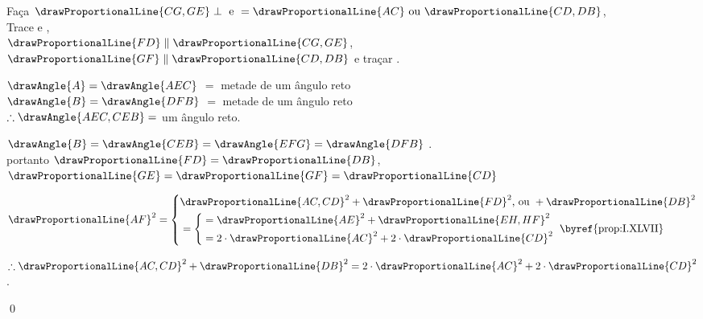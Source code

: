 \documentclass[booklanguage=brazilian]{byrnebook}
\begin{document}
\begin{center}
Faça $\drawProportionalLine{CG,GE} \perp \mbox{ e } = \drawProportionalLine{AC} \mbox{ ou } \drawProportionalLine{CD,DB}$,\\
Trace  e ,\\
$\drawProportionalLine{FD} \parallel \drawProportionalLine{CG,GE}$, $ \drawProportionalLine{GF} \parallel \drawProportionalLine{CD,DB}$ e traçar .

$\drawAngle{A} = \drawAngle{AEC}$  $=$ metade de um ângulo reto \\
$\drawAngle{B} = \drawAngle{DFB}$  $=$ metade de um ângulo reto \\
$\therefore \drawAngle{AEC,CEB} =$ um ângulo reto.

$\drawAngle{B} = \drawAngle{CEB} = \drawAngle{EFG} = \drawAngle{DFB}$ .\\
portanto $\drawProportionalLine{FD} = \drawProportionalLine{DB}$, $\drawProportionalLine{GE} = \drawProportionalLine{GF} = \drawProportionalLine{CD}$ 

$\drawProportionalLine{AF}^2 = \left\{
\begin{aligned}
&\drawProportionalLine{AC,CD}^2 + \drawProportionalLine{FD}^2 \mbox{, ou } + \drawProportionalLine{DB}^2 \\
&= \left\{
	\begin{aligned}
		&= \drawProportionalLine{AE}^2 + \drawProportionalLine{EH,HF}^2 \\
		&= 2 \cdot \drawProportionalLine{AC}^2 + 2 \cdot \drawProportionalLine{CD}^2\\
	\end{aligned}
	\right. \mbox{ \byref{prop:I.XLVII}}
\end{aligned}\right.$

$\therefore \drawProportionalLine{AC,CD}^2 + \drawProportionalLine{DB}^2 = 2 \cdot \drawProportionalLine{AC}^2 + 2 \cdot \drawProportionalLine{CD}^2$.
\end{center}

\qed
\end{document}
